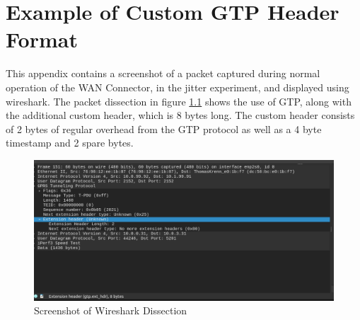 
\cleardoublepage
\chapter{Example of Custom GTP Header Format}
\label{appendix:gtp}

This appendix contains a screenshot of a packet captured during normal operation of the WAN Connector, in the jitter experiment, and displayed using wireshark. The packet dissection in figure \ref{fig:wshark} shows the use of GTP, along with the additional custom header, which is 8 bytes long. The custom header consists of 2 bytes of regular overhead from the GTP protocol as well as a 4 byte timestamp and 2 spare bytes.

\begin{figure}[ht]
    \centering
	\includegraphics[width=\linewidth]{fig/gtp_2.png}
	\caption{Screenshot of Wireshark Dissection}
	\label{fig:wshark}
\end{figure} 


